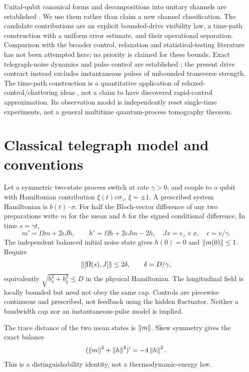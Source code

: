 \documentclass[11pt]{article}
\begin{document}
Unital-qubit canonical forms and decompositions into unitary channels are
established \cite{RSW,LiChoi}. We use them rather than claim a new channel
classification. The candidate contributions are an explicit bounded-drive
visibility law, a time-path construction with a uniform error estimate, and
their operational separation. Comparison with the broader control,
relaxation and statistical-testing literature has not been attempted here;
no priority is claimed for these bounds.
Exact telegraph-noise dynamics and pulse control are established
\cite{BergliFaoro}; the present drive contract instead excludes
instantaneous pulses of unbounded transverse strength. The time-path
construction is a quantitative application of relaxed-control/chattering
ideas \cite{Artstein}, not a claim to have discovered rapid-control
approximation. Its observation model is independently reset single-time
experiments, not a general multitime quantum-process tomography theorem.

\section{Classical telegraph model and conventions}
Let a symmetric two-state process switch at rate $\gamma>0$, and couple to
a qubit with Hamiltonian contribution $\xi(t)v\sigma_z$, $\xi=\pm1$.
A prescribed system Hamiltonian is $b(t)\cdot\sigma$.
For half the Bloch-vector difference of any two preparations write
$m$ for the mean and $h$ for the signed conditional difference.
In time $s=\gamma t$,
\begin{equation}\label{eq:tele}
 m'=\Omega m+2\epsilon Jh,\qquad
 h'=\Omega h+2\epsilon Jm-2h,
 \quad Jx=e_z\times x,\quad\epsilon=v/\gamma .
\end{equation}
The independent balanced initial noise state gives $h(0)=0$ and
$\left\lVert m(0)\right\rVert\leq1$. Require
\[
 \left\lVert [\Omega(s),J]\right\rVert\leq2\delta,\qquad
 \delta=D/\gamma ,
\]
equivalently $\sqrt{b_x^2+b_y^2}\leq D$ in the physical Hamiltonian.
The longitudinal field is locally bounded but need not obey the same cap.
Controls are piecewise continuous and prescribed, not feedback using the
hidden fluctuator. Neither a bandwidth cap nor an instantaneous-pulse model
is implied.

The trace distance of the two mean states is $\left\lVert m\right\rVert$.
Skew symmetry gives the exact balance
\begin{equation}\label{eq:balance}
 (\left\lVert m\right\rVert^2+\left\lVert h\right\rVert^2)'=-4\left\lVert h\right\rVert^2.
\end{equation}
This is a distinguishability identity, not a thermodynamic-energy law.
\end{document}
